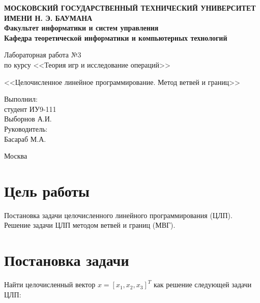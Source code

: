 \documentclass[12pt,a4paper,oneside]{extarticle}
\begin{document}
\pgfplotsset{compat=1.8}

\thispagestyle{empty}
\newpage
{
\centering


\textbf{
МОСКОВСКИЙ ГОСУДАРСТВЕННЫЙ ТЕХНИЧЕСКИЙ УНИВЕРСИТЕТ ИМЕНИ Н. Э. БАУМАНА \\
Факультет информатики и систем управления \\
Кафедра теоретической информатики и компьютерных технологий}
\bigskip
\bigskip
\bigskip
\bigskip
\bigskip
\bigskip
\bigskip

\vfill


Лабораторная работа №3 \\
по курсу <<Теория игр и исследование операций>>

\bigskip

{\large <<Целочисленное линейное программирование. Метод ветвей и границ>>}
\bigskip

\vfill



\hfill\parbox{4cm} {
Выполнил:\\
студент ИУ9-111 \hfill \\
Выборнов А.И.\hfill \medskip\\
Руководитель:\\
Басараб М.А.\hfill
}


\vspace{\fill}

Москва \number\year
\clearpage
}



\clearpage


\section{Цель работы}
    Постановка задачи целочисленного линейного программирования (ЦЛП). Решение задачи ЦЛП методом ветвей и границ (МВГ).

\section{Постановка задачи}
    Найти целочисленный вектор $x = [x_1, x_2, x_3]^T$ как решение следующей задачи ЦЛП:
    
\end{document}
